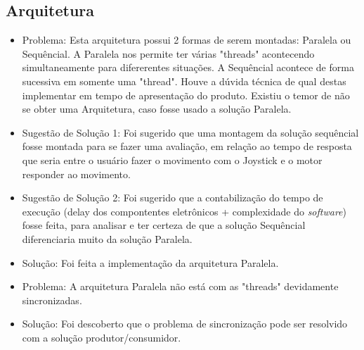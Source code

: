 \subsection{Arquitetura}
 \begin{itemize}
   \item Problema: Esta arquitetura possui 2 formas de serem montadas: Paralela ou Sequêncial. A Paralela nos permite ter várias "threads" acontecendo simultaneamente para difererentes situações. A Sequêncial acontece de forma sucessiva em somente uma  "thread". Houve a dúvida técnica de qual destas implementar em tempo de apresentação do produto. Existiu o temor de não se obter uma Arquitetura, caso fosse usado a solução Paralela.

	\item Sugestão de Solução 1: Foi sugerido que uma montagem da solução sequêncial fosse montada para se fazer uma avaliação, em relação ao tempo de resposta que seria entre o usuário fazer o movimento com o Joystick e o motor responder ao movimento.
  \item Sugestão de Solução 2: Foi sugerido que a contabilização do tempo de execução (delay dos compontentes eletrônicos + complexidade do \textit{software}) fosse feita, para analisar e ter certeza de que a solução Sequêncial diferenciaria muito da solução Paralela.
  \item Solução: Foi feita a implementação da arquitetura Paralela.

  \item Problema: A arquitetura Paralela não está com as "threads" devidamente sincronizadas.
  \item Solução: Foi descoberto que o problema de sincronização pode ser resolvido com a solução produtor/consumidor.
\end{itemize}

